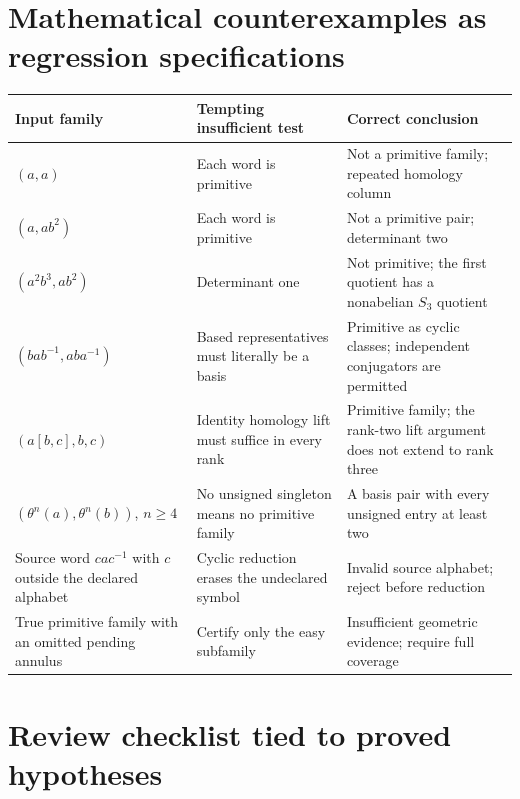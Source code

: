 \documentclass[11pt,a4paper]{article}
\theoremstyle{definition}
\theoremstyle{remark}
\begin{document}
\section{Mathematical counterexamples as regression specifications}
\label{app:controls}

\begin{longtable}{@{}>{\raggedright\arraybackslash}p{37mm}>{\raggedright\arraybackslash}p{38mm}>{\raggedright\arraybackslash}p{69mm}@{}}
\toprule
Input family & Tempting insufficient test & Correct conclusion\\
\midrule
\endhead
$(a,a)$ & Each word is primitive & Not a primitive family; repeated
homology column\\
$(a,ab^2)$ & Each word is primitive & Not a primitive pair; determinant two\\
$(a^2b^3,ab^2)$ & Determinant one & Not primitive; the first quotient has a
nonabelian $S_3$ quotient\\
$(bab^{-1},aba^{-1})$ & Based representatives must literally be a basis &
Primitive as cyclic classes; independent conjugators are permitted\\
$(a[b,c],b,c)$ & Identity homology lift must suffice in every rank &
Primitive family; the rank-two lift argument does not extend to rank three\\
$(\theta^n(a),\theta^n(b))$, $n\ge4$ & No unsigned singleton means no
primitive family & A basis pair with every unsigned entry at least two\\
Source word $cac^{-1}$ with $c$ outside the declared alphabet & Cyclic
reduction erases the undeclared symbol & Invalid source alphabet; reject
before reduction\\
True primitive family with an omitted pending annulus & Certify only the
easy subfamily & Insufficient geometric evidence; require full coverage\\
\bottomrule
\end{longtable}

\section{Review checklist tied to proved hypotheses}
\end{document}
